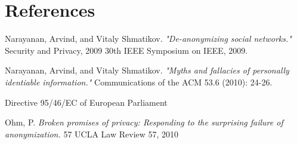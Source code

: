 \documentclass[preprint,12pt]{elsarticle}
\theoremstyle{definition}
\theoremstyle{remark}
\begin{document}

\section{References}
\begin{thebibliography}{3}

Narayanan, Arvind, and Vitaly Shmatikov.
\textit{"De-anonymizing social networks."} Security and Privacy, 2009 30th IEEE Symposium on IEEE, 2009.

Narayanan, Arvind, and Vitaly Shmatikov.
\textit{"Myths and fallacies of personally identiable information."}
Communications of the ACM 53.6 (2010): 24-26.

Directive 95/46/EC of European Parliament

Ohm, P.
\textit{Broken promises of privacy: Responding to the surprising failure of anonymization.}
57 UCLA Law Review 57, 2010

\end{thebibliography}






\end{document}
